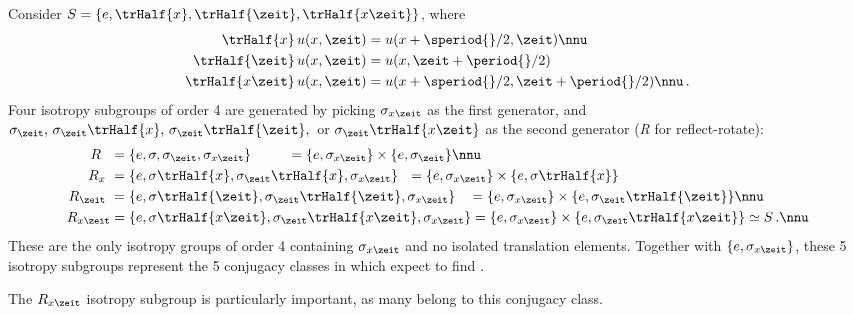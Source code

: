 Consider $S = \{e, \trHalf{x}, \trHalf{\zeit}, \trHalf{x\zeit}\}$, where
\begin{align}
\trHalf{x} \, u(x,\zeit) &=  u(x+\speriod{}/2,\zeit) \nnu \\
\trHalf{\zeit} \, u(x,\zeit) &=  u(x,\zeit+\period{}/2) \label{shiftRot}\\
\trHalf{x\zeit} \, u(x,\zeit) &=  u(x+\speriod{}/2,\zeit+\period{}/2) \nnu
\,.
\end{align}
Four isotropy subgroups of order 4 are generated by picking
$\sigma_{x\zeit}$ as the first generator, and $\sigma_{\zeit},\, \sigma_{\zeit}
\trHalf{x},\, \sigma_{\zeit} \trHalf{\zeit},\,$ or $\sigma_{\zeit} \trHalf{x\zeit}$
as the second generator (\emph{R} for reflect-rotate):
\begin{align}
 R~~  &=  \{e, \sigma, \sigma_\zeit, \sigma_{x\zeit}\}
      ~~~~~~~\; = \{e,\sigma_{x\zeit}\} \times \{e,\sigma_{\zeit}\} \nnu\\
 R_x~ &=  \{e,\sigma \trHalf{x}, \sigma_\zeit \trHalf{x}, \sigma_{x\zeit}\}
      ~~ = \{e,\sigma_{x\zeit}\} \times \{e,\sigma\trHalf{x}\}
        \label{subg4RR} \\
 R_\zeit~ &=  \{e, \sigma \trHalf{\zeit}, \sigma_\zeit \trHalf{\zeit}, \sigma_{x\zeit}\}
      ~~\; = \{e,\sigma_{x\zeit}\} \times \{e,\sigma_{\zeit}\trHalf{\zeit}\}
        \nnu\\
 R_{x\zeit} &= \{e, \sigma \trHalf{x\zeit}, \sigma_\zeit \trHalf{x\zeit}, \sigma_{x\zeit}\}
        = \{e,\sigma_{x\zeit}\} \times \{e,\sigma_{\zeit}\trHalf{x\zeit}\}
        \simeq S \,. \nnu
\end{align}
These are the only isotropy groups of order 4 containing $\sigma_{x\zeit}$
and no isolated translation elements. Together with $\{e,\sigma_{x\zeit}\}$,
these 5 isotropy subgroups represent the 5 conjugacy classes in
which expect to find {\eqva}.

The $R_{x\zeit}$ isotropy subgroup is particularly important, as many
{\eqva} belong to this conjugacy class.
